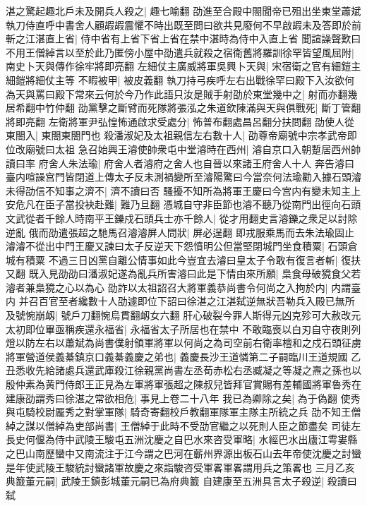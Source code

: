 湛之驚起趣北戶未及開兵人殺之|{
	趣七喻翻}
劭進至合殿中閤聞帝已殂出坐東堂蕭斌執刀侍直呼中書舍人顧嘏嘏震懼不時出既至問曰欲共見廢何不早啟嘏未及答即於前斬之江湛直上省|{
	侍中省有上省下省上省在禁中湛時為侍中入直上省}
聞諠譟聲歎曰不用王僧綽言以至於此乃匿傍小屋中劭遣兵就殺之宿衛舊將羅訓徐罕皆望風屈附|{
	南史卜天與傳作徐牢將即亮翻}
左細仗主廣威將軍吳興卜天與|{
	宋宿衛之官有細鎧主細鎧將細仗主等}
不暇被甲|{
	被皮義翻}
執刀持弓疾呼左右出戰徐罕曰殿下入汝欲何為天與罵曰殿下常來云何於今乃作此語只汝是賊手射劭於東堂幾中之|{
	射而亦翻幾居希翻中竹仲翻}
劭黨擊之斷臂而死隊將張泓之朱道欽陳滿與天與俱戰死|{
	斷丁管翻將即亮翻}
左衛將軍尹弘惶怖通啟求受處分|{
	怖普布翻處昌呂翻分扶問翻}
劭使人從東閤入|{
	東閤東閤門也}
殺潘淑妃及太祖親信左右數十人|{
	劭尊帝廟號中宗孝武帝即位改廟號曰太祖}
急召始興王濬使帥衆屯中堂濬時在西州|{
	濬自京口入朝蹔居西州帥讀曰率}
府舍人朱法瑜|{
	府舍人者濬府之舍人也自晉以來諸王府舍人十人}
奔告濬曰臺内喧譟宫門皆閉道上傳太子反未測禍變所至濬陽驚曰今當奈何法瑜勸入據石頭濬未得劭信不知事之濟不|{
	濟不讀曰否}
騷擾不知所為將軍王慶曰今宫内有變未知主上安危凡在臣子當投袂赴難|{
	難乃旦翻}
憑城自守非臣節也濬不聽乃從南門出徑向石頭文武從者千餘人時南平王鑠戍石頭兵士亦千餘人|{
	從才用翻史言濬鑠之衆足以討除逆亂}
俄而劭遣張超之馳馬召濬濬屏人問狀|{
	屏必逞翻}
即戎服乘馬而去朱法瑜固止濬濬不從出中門王慶又諫曰太子反逆天下怨憤明公但當堅閉城門坐食積粟|{
	石頭倉城有積粟}
不過三日凶黨自離公情事如此今豈宜去濬曰皇太子令敢有復言者斬|{
	復扶又翻}
既入見劭劭曰潘淑妃遂為亂兵所害濬曰此是下情由來所願|{
	梟食母破獍食父若濬者兼梟獍之心以為心}
劭詐以太祖詔召大將軍義恭尚書令何尚之入拘於内|{
	内謂臺内}
并召百官至者纔數十人劭遽即位下詔曰徐湛之江湛弑逆無狀吾勒兵入殿已無所及號惋崩衂|{
	號戶刀翻惋烏貫翻衂女六翻}
肝心破裂今罪人斯得元凶克殄可大赦改元太初即位畢亟稱疾還永福省|{
	永福省太子所居也在禁中}
不敢臨喪以白刃自守夜則列燈以防左右以蕭斌為尚書僕射領軍將軍以何尚之為司空前右衛率檀和之戍石頭征虜將軍營道侯義綦鎮京口義綦義慶之弟也|{
	義慶長沙王道憐第二子嗣臨川王道規國}
乙丑悉收先給諸處兵還武庫殺江徐親黨尚書左丞荀赤松右丞臧凝之等凝之燾之孫也以殷仲素為黄門侍郎王正見為左軍將軍張超之陳叔兒皆拜官賞賜有差輔國將軍魯秀在建康劭謂秀曰徐湛之常欲相危|{
	事見上卷二十八年}
我已為卿除之矣|{
	為于偽翻}
使秀與屯騎校尉龎秀之對掌軍隊|{
	騎奇寄翻校戶教翻軍隊軍主隊主所統之兵}
劭不知王僧綽之謀以僧綽為吏部尚書|{
	王僧綽于此時不受劭官繼之以死則人臣之節盡矣}
司徒左長史何偃為侍中武陵王駿屯五洲沈慶之自巴水來咨受軍略|{
	水經巴水出廬江雩婁縣之巴山南歷蠻中又南流注于江今謂之巴河在蘄州界源出板石山去年帝使沈慶之討蠻是年使武陵王駿統討蠻諸軍故慶之來詣駿咨受軍畧軍畧謂用兵之策畧也}
三月乙亥典籖董元嗣|{
	武陵王鎮彭城董元嗣已為府典籖}
自建康至五洲具言太子殺逆|{
	殺讀曰弑}
